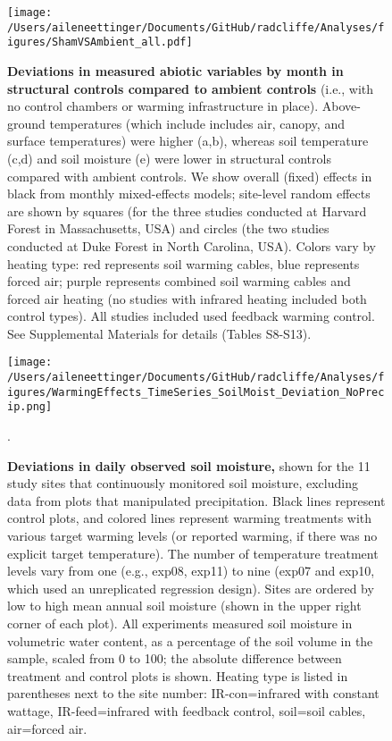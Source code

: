 \documentclass{article}
\begin{document}
 \begin{figure}[h]
\centering
\texttt{[image: /Users/aileneettinger/Documents/GitHub/radcliffe/Analyses/figures/ShamVSAmbient\_all.pdf]} 
 \caption{\textbf{Deviations in measured abiotic variables by month in structural controls compared to ambient controls} (i.e., with no control chambers or warming infrastructure in place). Above-ground temperatures (which include includes air, canopy, and surface temperatures) were higher (a,b), whereas soil temperature (c,d) and soil moisture (e) were lower in structural controls compared with ambient controls. We show overall (fixed) effects in black from monthly mixed-effects models; site-level random effects are shown by squares (for the three studies conducted at Harvard Forest in Massachusetts, USA) and circles (the two studies conducted at Duke Forest in North Carolina, USA). Colors vary by heating type: red represents soil warming cables, blue represents forced air; purple represents combined soil warming cables and forced air heating (no studies with infrared heating included both control types). All studies included used feedback warming control. See Supplemental Materials for details (Tables S8-S13). }
 \label{fig:shamamb}
 \end{figure}
\clearpage
 \begin{figure}[h!]
 \centering
 \texttt{[image: /Users/aileneettinger/Documents/GitHub/radcliffe/Analyses/figures/WarmingEffects\_TimeSeries\_SoilMoist\_Deviation\_NoPrecip.png]} 
 \caption{\textbf{Deviations in daily observed soil moisture,} shown for the 11 study sites that continuously monitored soil moisture, excluding data from plots that manipulated precipitation. Black lines represent control plots, and colored lines represent warming treatments with various target warming levels (or reported warming, if there was no explicit target temperature). The number of temperature treatment levels vary from one (e.g., exp08, exp11) to nine (exp07 and exp10, which used an unreplicated regression design). Sites are ordered by low to high mean annual soil moisture (shown in the upper right corner of each plot). All experiments measured soil moisture in volumetric water content, as a percentage of the soil volume in the sample, scaled from 0 to 100; the absolute difference between treatment and control plots is shown. Heating type is listed in parentheses next to the site number: IR-con=infrared with constant wattage, IR-feed=infrared with feedback control, soil=soil cables, air=forced air.}. 
 \label{fig:mois}
 \end{figure}
\end{document}
